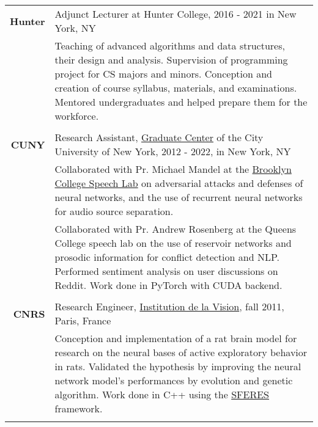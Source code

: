\documentclass[a4paper,10pt]{article}
\begin{document}
\begin{tabular}{r|p{160mm}}
        \textbf{Hunter} & Adjunct Lecturer at Hunter College, 2016 - 2021 in New York, NY\\
        & \small{Teaching of advanced algorithms and data structures, their design and analysis. Supervision of programming project for CS majors and minors. Conception and creation of course syllabus, materials, and examinations. Mentored undergraduates and helped prepare them for the workforce. }\\
        \multicolumn{2}{c}{} \vspace{-1.5mm} \\
        
        \textbf{CUNY} & Research Assistant, \href{https://www.gc.cuny.edu/}{Graduate Center} of the City University of New York, 2012 - 2022, in New York, NY \\
        & \small{Collaborated with Pr. Michael Mandel at the \href{https://github.com/grezesf/Resume/blob/bcbe079a5833f0be5bcf5f0fd9cfc6c8bdc12b10/files/SpeechLab.pdf}{Brooklyn College Speech Lab} on adversarial attacks and defenses of neural networks, and the use of recurrent neural networks for audio source separation.}\\
        & \small{Collaborated with Pr. Andrew Rosenberg at the Queens College speech lab on the use of reservoir networks and prosodic information for conflict detection and NLP. Performed sentiment analysis on user discussions on Reddit. Work done in PyTorch with CUDA backend.}\\
        \multicolumn{2}{c}{} \vspace{-1.5mm} \\

        \textbf{CNRS} & Research Engineer, \href{https://www.institut-vision.org/index.php/en/research/aging-vision-and-action}{Institution de la Vision}, fall 2011, Paris, France\\
        & \small{Conception and implementation of a rat brain model for research on the neural bases of active exploratory behavior in rats. Validated the hypothesis by improving the neural network model's performances by evolution and genetic algorithm. Work done in C++ using the \href{https://github.com/sferes2/sferes2}{SFERES} framework.}\\
        \multicolumn{2}{c}{} \vspace{-1.5mm} \\
        

\end{tabular}
\end{document}
